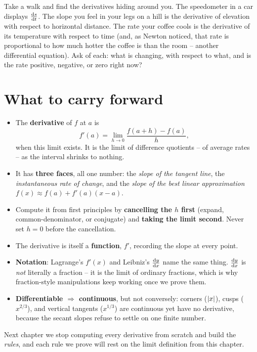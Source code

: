 \begin{walkbox}
Take a walk and find the derivatives hiding around you. The speedometer in a car
displays $\frac{\mathrm{d} s}{\mathrm{d} t}$. The slope you feel in your legs on a hill is the
derivative of elevation with respect to horizontal distance. The rate your coffee
cools is the derivative of its temperature with respect to time (and, as Newton
noticed, that rate is proportional to how much hotter the coffee is than the room
-- another differential equation). Ask of each: what is changing, with respect to
what, and is the rate positive, negative, or zero right now?
\end{walkbox}

\section{What to carry forward}
\label{ch10:summary}

\begin{recoverybox}
\begin{itemize}
  \item The \textbf{derivative} of $f$ at $a$ is
  \[
    f'(a) = \lim_{h\to 0}\frac{f(a+h)-f(a)}{h},
  \]
  when this limit
  exists. It is the limit of difference quotients -- of average rates -- as the
  interval shrinks to nothing.
  \item It has \textbf{three faces}, all one number: the \emph{slope of the
  tangent line}, the \emph{instantaneous rate of change}, and the \emph{slope of
  the best linear approximation} $f(x)\approx f(a)+f'(a)(x-a)$.
  \item Compute it from first principles by \textbf{cancelling the $h$ first}
  (expand, common-denominator, or conjugate) and \textbf{taking the limit second}.
  Never set $h=0$ before the cancellation.
  \item The derivative is itself a \textbf{function}, $f'$, recording the slope at
  every point.
  \item \textbf{Notation}: Lagrange's $f'(x)$ and Leibniz's $\frac{\mathrm{d} y}{\mathrm{d} x}$ name the
  same thing. $\frac{\mathrm{d} y}{\mathrm{d} x}$ is \emph{not} literally a fraction -- it is the limit of
  ordinary fractions, which is why fraction-style manipulations keep working once we
  prove them.
  \item \textbf{Differentiable $\Rightarrow$ continuous}, but not conversely:
  corners ($\lvert x\rvert$), cusps ($x^{2/3}$), and vertical tangents ($x^{1/3}$) are
  continuous yet have no derivative, because the secant slopes refuse to settle on
  one finite number.
\end{itemize}
Next chapter we stop computing every derivative from scratch and build the
\emph{rules}, and each rule we prove will rest on the limit definition
from this chapter.
\end{recoverybox}

